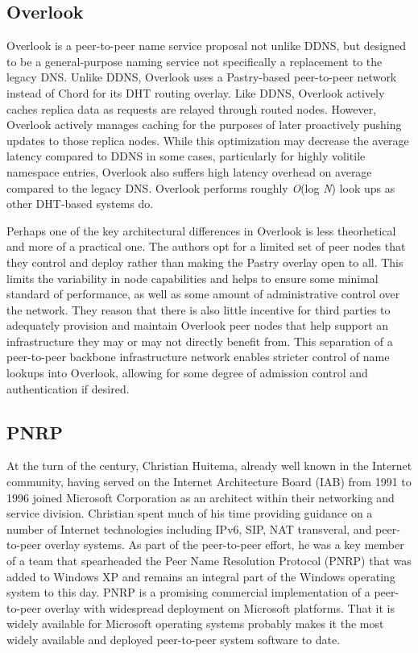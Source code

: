 \documentclass[sigconf]{acmart}
\begin{document}
\subsection{Overlook}

Overlook is a peer-to-peer name service proposal not unlike DDNS, but
designed to be a general-purpose naming service not specifically a
replacement to the legacy DNS.\cite{theimer_overlook:_2002}  Unlike
DDNS, Overlook uses a Pastry-based peer-to-peer network instead of Chord
for its DHT routing overlay.\cite{rowstron_pastry:_2001}  Like DDNS,
Overlook actively caches replica data as requests are relayed through
routed nodes.  However, Overlook actively manages caching for the
purposes of later proactively pushing updates to those replica nodes.
While this optimization may decrease the average latency compared to
DDNS in some cases, particularly for highly volitile namespace entries,
Overlook also suffers high latency overhead on average compared to the
legacy DNS.  Overlook performs roughly \emph{O}(log \emph{N}) look ups
as other DHT-based systems do.

Perhaps one of the key architectural differences in Overlook is less
theorhetical and more of a practical one.  The authors opt for a limited
set of peer nodes that they control and deploy rather than making the
Pastry overlay open to all.  This limits the variability in node
capabilities and helps to ensure some minimal standard of performance,
as well as some amount of administrative control over the network.  They
reason that there is also little incentive for third parties to
adequately provision and maintain Overlook peer nodes that help support
an infrastructure they may or may not directly benefit from.  This
separation of a peer-to-peer backbone infrastructure network enables
stricter control of name lookups into Overlook, allowing for some degree
of admission control and authentication if desired.

\subsection{PNRP}

At the turn of the century, Christian Huitema, already well known in the
Internet community, having served on the Internet Architecture Board
(IAB) from 1991 to 1996 joined Microsoft Corporation as an architect
within their networking and service division.  Christian spent much of
his time providing guidance on a number of Internet technologies
including IPv6, SIP, NAT transveral, and peer-to-peer overlay systems.
As part of the peer-to-peer effort, he was a key member of a team that
spearheaded the Peer Name Resolution Protocol (PNRP) that was added to
Windows XP and remains an integral part of the Windows operating system
to this day.\cite{huitema_peer--peer_2006}  PNRP is a promising
commercial implementation of a peer-to-peer overlay with widespread
deployment on Microsoft platforms.  That it is widely available for
Microsoft operating systems probably makes it the most widely available
and deployed peer-to-peer system software to date.
\end{document}

